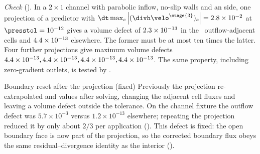 \emph{Check} (). In a $2\times1$ channel with parabolic
inflow, no-slip walls and an  side, one projection of a
predictor with
$\dt\max_c\abs{(\divh\velo^{\stage{3}})_c}=\chkProjOutflowPredictor$ at
$\presstol=10^{-12}$ gives a volume defect of $2.3\times10^{-13}$ in the
\chkProjOutflowCells\ outflow-adjacent cells and $4.4\times10^{-13}$
elsewhere. The former must be at most ten times the latter. Four further
projections give maximum volume defects $4.4\times10^{-13}, 4.4\times10^{-13}, 4.4\times10^{-13}, 4.4\times10^{-13}$.
The same property, including zero-gradient outlets, is tested by
.

\begin{deviation}{Boundary reset after the projection (fixed)}\label{dev:projection:outflow}
Previously the projection re-extrapolated  and
 values after solving, changing the adjacent
cell fluxes and leaving a volume defect outside the tolerance. On the channel
fixture the outflow defect was $5.7\times10^{-3}$ versus
$1.2\times10^{-13}$ elsewhere; repeating the projection reduced it by only
about $2/3$ per application
(). This defect is fixed:
the open boundary face is now part of the projection, so the corrected
boundary flux obeys the same residual--divergence identity as the interior
().
\end{deviation}

